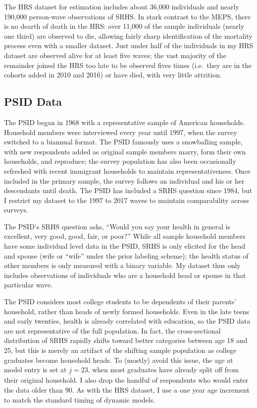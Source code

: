 \documentclass[12pt,pdftex,letterpaper]{article}
\newcommand{\Age}{j}
\newcommand{\AgeMin}{\underline{\Age}}
\begin{document}
The HRS dataset for estimation includes about 36,000 individuals and nearly 190,000 person-wave observations of SRHS.  In stark contrast to the MEPS, there is no dearth of death in the HRS: over 11,000 of the sample individuals (nearly one third) are observed to die, allowing fairly sharp identification of the mortality process even with a smaller dataset.  Just under half of the individuals in my HRS dataset are observed alive for at least five waves; the vast majority of the remainder joined the HRS too late to be observed fives times (i.e.\ they are in the cohorts added in 2010 and 2016) or have died, with very little attrition.


\subsection{PSID Data}\label{sec:PSID}

The PSID began in 1968 with a representative sample of American households.  Household members were interviewed every year until 1997, when the survey switched to a biannual format.  The PSID famously uses a snowballing sample, with new respondents added as original sample members marry, form their own households, and reproduce; the survey population has also been occasionally refreshed with recent immigrant households to maintain representativeness.  Once included in the primary sample, the survey follows an individual and his or her descendants until death.  The PSID has included a SRHS question since 1984, but I restrict my dataset to the 1997 to 2017 waves to maintain comparability across surveys.

The PSID's SRHS question asks, ``Would you say your health in general is excellent, very good, good, fair, or poor?''  While all sample household members have some individual level data in the PSID, SRHS is only elicited for the head and spouse (wife or ``wife'' under the prior labeling scheme); the health status of other members is only measured with a binary variable.  My dataset thus only includes observations of individuals who are a household head or spouse in that particular wave.

The PSID considers most college students to be dependents of their parents' household, rather than heads of newly formed households.  Even in the late teens and early twenties, health is already correlated with education, so the PSID data are not representative of the full population.  In fact, the cross-sectional distribution of SRHS rapidly shifts toward better categories between age 18 and 25, but this is merely an artifact of the shifting sample population as college graduates become household heads.  To (mostly) avoid this issue, the age at model entry is set at $\AgeMin=23$, when most graduates have already split off from their original household.  I also drop the handful of respondents who would enter the data older than 90.  As with the HRS dataset, I use a one year age increment to match the standard timing of dynamic models.
\end{document}
